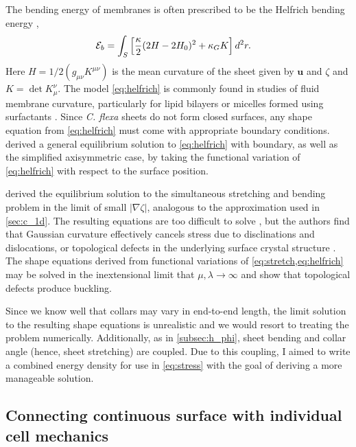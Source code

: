 The bending energy of membranes is often prescribed to be the Helfrich bending energy \citep{helfrich1973},
\begin{align}
	\mathcal{E}_b &= \int_S \left[ \frac{\kappa}{2} (2H - 2H_0)^2 + \kappa_G K \right] d^2r. \label{eq:helfrich}	
\end{align}
\noindent Here $H=1/2 (g_{\mu\nu}K^{\mu\nu})$ is the mean curvature of the sheet given by $\bm{u}$ and $\zeta$ and $K = \det K_\mu^\nu$. 
The model \cref{eq:helfrich} is commonly found in studies of fluid membrane curvature, particularly for lipid bilayers or micelles formed using surfactants \citep{andelman1994,seifert1997}.
Since \textit{C. flexa} sheets do not form closed surfaces, any shape equation from \cref{eq:helfrich} must come with appropriate boundary conditions. 
\citet{tu2003} derived a general equilibrium solution to \cref{eq:helfrich} with boundary, as well as the simplified axisymmetric case, by taking the functional variation of \cref{eq:helfrich} with respect to the surface position.

\citet{seung1988} derived the equilibrium solution to the simultaneous stretching and bending problem in the limit of small $|\nabla \zeta|$, analogous to the approximation used in \cref{sec:c_1d}.
The resulting equations are too difficult to solve \citep{landau1986}, but the authors find that Gaussian curvature effectively cancels stress due to disclinations and dislocations, or topological defects in the underlying surface crystal structure \citep{sachdev1984}.
The shape equations derived from functional variations of \cref{eq:stretch,eq:helfrich} may be solved in the inextensional limit that $\mu,\lambda \to\infty$ and show that topological defects produce buckling.

Since we know well that collars may vary in end-to-end length, the limit solution to the resulting shape equations is unrealistic and we would resort to treating the problem numerically.
Additionally, as in \cref{subsec:h_phi}, sheet bending and collar angle (hence, sheet stretching) are coupled. 
Due to this coupling, I aimed to write a combined energy density for use in \cref{eq:stress} with the goal of deriving a more manageable solution.

\subsection{Connecting continuous surface with individual cell mechanics}

